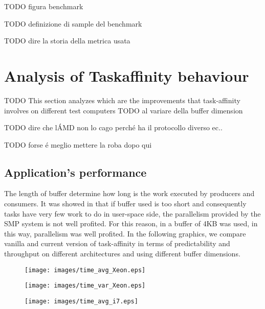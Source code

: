 TODO figura benchmark

TODO definizione di sample del benchmark

TODO dire la storia della metrica usata

\section{Analysis of Taskaffinity behaviour}

TODO 
This section analyzes which are the improvements that task-affinity involves on different test computers TODO al variare della buffer dimension

TODO 
dire che l\'AMD non lo cago perch\'e ha il protocollo diverso ec..

TODO forse \'e meglio mettere la roba dopo qui


\subsection{Application's performance}

The length of buffer determine how long is the work executed by producers and consumers. It was showed in \cite{lcs} that if buffer used is too short and 
consequently tasks have very few work to do in user-space side, the parallelism provided by the SMP system is not well profited. For this reason, in 
\cite{lcs} a buffer of 4KB was used, in this way, parallelism was well profited. In the following graphics, we compare vanilla and current version 
of task-affinity in terms of predictability and throughput on different architectures and using different buffer dimensions.

\begin{figure}[htbp]
\centering
\texttt{[image: images/time\_avg\_Xeon.eps]}
\caption{}
\label{fig:avg_xeon}
\end{figure}

\begin{figure}[htbp]
\centering
\texttt{[image: images/time\_var\_Xeon.eps]}
\caption{}
\label{fig:var_xeon}
\end{figure}

\newpage

\begin{figure}[htbp]
\centering
\texttt{[image: images/time\_avg\_i7.eps]}
\caption{}
\label{fig:avg_xeon}
\end{figure}

